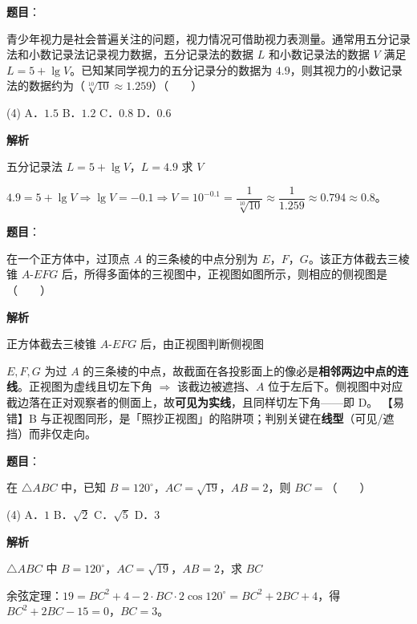 \begin{answer}

\textbf{题目}：

青少年视力是社会普遍关注的问题，视力情况可借助视力表测量。通常用五分记录法和小数记录法记录视力数据，五分记录法的数据 $L$ 和小数记录法的数据 $V$ 满足 $L=5+\lg V$。已知某同学视力的五分记录分的数据为 $4.9$，则其视力的小数记录法的数据约为（$\sqrt[10]{10}\approx1.259$）\mbox{（　　）}

\begin{gkopts}(4)
\task A．$1.5$
\task B．$1.2$
\task C．$0.8$
\task D．$0.6$
\end{gkopts}

\textbf{解析}

五分记录法 $L=5+\lg V$，$L=4.9$ 求 $V$

$4.9=5+\lg V\Rightarrow\lg V=-0.1\Rightarrow V=10^{-0.1}=\dfrac1{\sqrt[10]{10}}\approx\dfrac1{1.259}\approx0.794\approx0.8$。


\end{answer}
\begin{answer}

\textbf{题目}：

在一个正方体中，过顶点 $A$ 的三条棱的中点分别为 $E$，$F$，$G$。该正方体截去三棱锥 $A\text{-}EFG$ 后，所得多面体的三视图中，正视图如图所示，则相应的侧视图是\mbox{（　　）}
\nopagebreak[4]
\begin{center}\end{center}
\nopagebreak[4]
\textbf{解析}

正方体截去三棱锥 $A\text{-}EFG$ 后，由正视图判断侧视图

$E,F,G$ 为过 $A$ 的三条棱的中点，故截面在各投影面上的像必是\textbf{相邻两边中点的连线}。正视图为虚线且切左下角 $\Rightarrow$ 该截边被遮挡、$A$ 位于左后下。侧视图中对应截边落在正对观察者的侧面上，故\textbf{可见为实线}，且同样切左下角——即 D。
【易错】B 与正视图同形，是「照抄正视图」的陷阱项；判别关键在\textbf{线型}（可见/遮挡）而非仅走向。


\end{answer}
\begin{answer}

\textbf{题目}：

在 $\triangle ABC$ 中，已知 $B=120^\circ$，$AC=\sqrt{19}$，$AB=2$，则 $BC=$\mbox{（　　）}

\begin{gkopts}(4)
\task A．$1$
\task B．$\sqrt2$
\task C．$\sqrt5$
\task D．$3$
\end{gkopts}

\textbf{解析}

$\triangle ABC$ 中 $B=120^\circ$，$AC=\sqrt{19}$，$AB=2$，求 $BC$

余弦定理：$19=BC^2+4-2\cdot BC\cdot2\cos120^\circ=BC^2+2BC+4$，得 $BC^2+2BC-15=0$，$BC=3$。


\end{answer}
